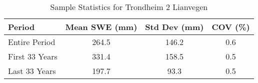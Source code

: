 
    \begin{table}[h!]
        \centering
        \caption{Sample Statistics for Trondheim 2 Lianvegen}
        \begin{tabular}{lccc} 
            \toprule
            \textbf{Period} & \textbf{Mean SWE (mm)} & \textbf{Std Dev (mm)} & \textbf{COV (\%)} \\
            \midrule
            Entire Period & 264.5 & 146.2 & 0.6 \\
            First 33 Years & 331.4 & 158.5 & 0.5 \\
            Last 33 Years & 197.7 & 93.3 & 0.5 \\
            \bottomrule
        \end{tabular}
        \label{tab:sample_stats_Trondheim 2 Lianvegen}
    \end{table}
    
